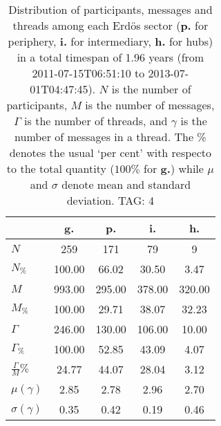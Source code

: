 \begin{table}[h!]
\begin{center}
\begin{tabular}{| l || c | c | c | c |}\hline
 & {\bf g.} & {\bf p.} & {\bf i.} & {\bf h.} \\\hline\hline
$N$ & 259  & 171  & 79  & 9 \\
$N_{\%}$ & 100.00  & 66.02  & 30.50  & 3.47 \\\hline
$M$ & 993.00  & 295.00  & 378.00  & 320.00 \\
$M_{\%}$ & 100.00  & 29.71  & 38.07  & 32.23 \\\hline
$\Gamma$ & 246.00  & 130.00  & 106.00  & 10.00 \\
$\Gamma_{\%}$ & 100.00  & 52.85  & 43.09  & 4.07 \\\hline
$\frac{\Gamma}{M}\%$ & 24.77  & 44.07  & 28.04  & 3.12 \\
$\mu(\gamma)$ & 2.85  & 2.78  & 2.96  & 2.70 \\
$\sigma(\gamma)$ & 0.35  & 0.42  & 0.19  & 0.46 \\\hline
\end{tabular}
\caption{Distribution of participants, messages and threads among each Erd\"os sector ({\bf p.} for periphery, {\bf i.} for intermediary, 
    {\bf h.} for hubs) in a total timespan of 1.96 years (from 2011-07-15T06:51:10 to 2013-07-01T04:47:45). $N$ is the number of participants, $M$ is the number of messages, $\Gamma$ is the number of threads, and $\gamma$ is the number of messages in a thread.
    The \% denotes the usual `per cent' with respecto to the total quantity ($100\%$ for {\bf g.})
    while $\mu$ and $\sigma$ denote mean and standard deviation. TAG: 4}
\end{center}
\end{table}